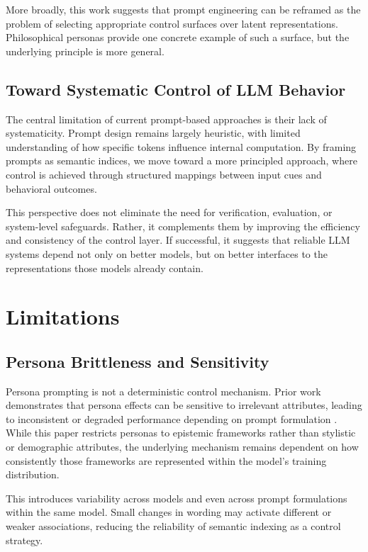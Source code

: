 \documentclass[11pt]{article}
\begin{document}
More broadly, this work suggests that prompt engineering can be reframed as the problem of selecting appropriate control surfaces over latent representations. Philosophical personas provide one concrete example of such a surface, but the underlying principle is more general.

\subsection{Toward Systematic Control of LLM Behavior}

The central limitation of current prompt-based approaches is their lack of systematicity. Prompt design remains largely heuristic, with limited understanding of how specific tokens influence internal computation. By framing prompts as semantic indices, we move toward a more principled approach, where control is achieved through structured mappings between input cues and behavioral outcomes.

This perspective does not eliminate the need for verification, evaluation, or system-level safeguards. Rather, it complements them by improving the efficiency and consistency of the control layer. If successful, it suggests that reliable LLM systems depend not only on better models, but on better interfaces to the representations those models already contain.

\section{Limitations}

\subsection{Persona Brittleness and Sensitivity}

Persona prompting is not a deterministic control mechanism. Prior work demonstrates that persona effects can be sensitive to irrelevant attributes, leading to inconsistent or degraded performance depending on prompt formulation \cite{araujo2025principled}. While this paper restricts personas to epistemic frameworks rather than stylistic or demographic attributes, the underlying mechanism remains dependent on how consistently those frameworks are represented within the model’s training distribution.

This introduces variability across models and even across prompt formulations within the same model. Small changes in wording may activate different or weaker associations, reducing the reliability of semantic indexing as a control strategy.
\end{document}
